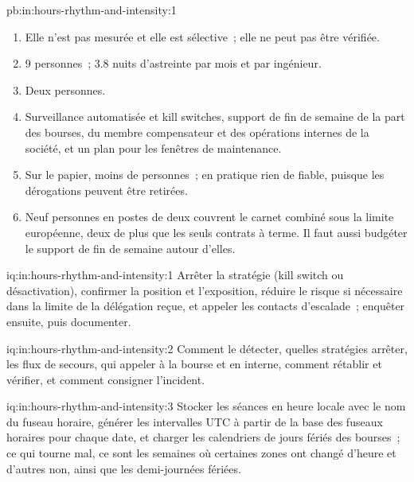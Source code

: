 \begin{solution}{pb:in:hours-rhythm-and-intensity:1}
\begin{enumerate}
\item Elle n'est pas mesurée et elle est sélective~; elle ne peut pas être vérifiée.
\item 9 personnes~; 3.8 nuits d'astreinte par mois et par ingénieur.
\item Deux personnes.
\item Surveillance automatisée et kill switches, support de fin de semaine de la part des bourses, du membre compensateur et des opérations internes
de la société, et un plan pour les fenêtres de maintenance.
\item Sur le papier, moins de personnes~; en pratique rien de fiable, puisque les dérogations peuvent être retirées.
\item Neuf personnes en postes de deux couvrent le carnet combiné sous la limite européenne, deux de plus que les seuls contrats à terme.
Il faut aussi budgéter le support de fin de semaine autour d'elles.
\end{enumerate}
\end{solution}

\begin{solution}{iq:in:hours-rhythm-and-intensity:1}
Arrêter la stratégie (kill switch ou désactivation), confirmer la position et l'exposition, réduire le risque si nécessaire
dans la limite de la délégation reçue, et appeler les contacts d'escalade~; enquêter ensuite, puis documenter.
\end{solution}

\begin{solution}{iq:in:hours-rhythm-and-intensity:2}
Comment le détecter, quelles stratégies arrêter, les flux de secours, qui appeler à la bourse et en interne, comment
rétablir et vérifier, et comment consigner l'incident.
\end{solution}

\begin{solution}{iq:in:hours-rhythm-and-intensity:3}
Stocker les séances en heure locale avec le nom du fuseau horaire, générer les intervalles UTC à partir de la base des fuseaux horaires pour chaque date,
et charger les calendriers de jours fériés des bourses~; ce qui tourne mal, ce sont les semaines où certaines zones ont changé d'heure et d'autres non,
ainsi que les demi-journées fériées.
\end{solution}

